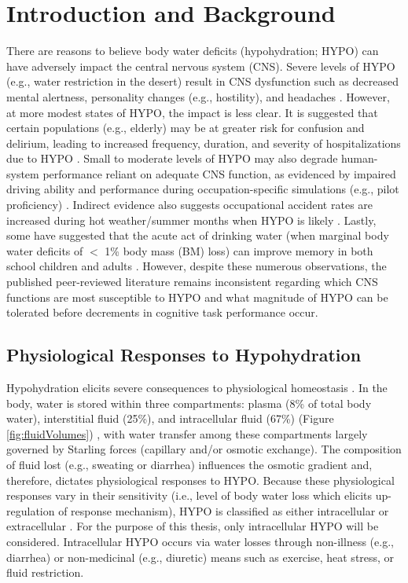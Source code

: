 \chapter{Introduction and Background}

There are reasons to believe body water deficits (hypohydration; HYPO) can have adversely impact the central nervous system (CNS). Severe levels of HYPO (e.g., water restriction in the desert) result in CNS dysfunction such as decreased mental alertness, personality changes (e.g., hostility), and headaches \cite{adolf_physiology_1947, king_brief_1878}. However, at more modest states of HYPO, the impact is less clear. It is suggested that certain populations (e.g., elderly) may be at greater risk for confusion and delirium, leading to increased frequency, duration, and severity of hospitalizations due to HYPO \cite{inouye_delirium_2006,warren_burden_1994}. Small to moderate levels of HYPO may also degrade human-system performance reliant on adequate CNS function, as evidenced by impaired driving ability \cite{watson_mild_2015} and performance during occupation-specific simulations (e.g., pilot proficiency) \cite{lindseth_effects_2013}. Indirect evidence also suggests occupational accident rates are increased during hot weather/summer months when HYPO is likely \cite{kenefick_hydration_2007, kenefick_dehydration_2012}. Lastly, some have suggested that the acute act of drinking water (when marginal body water deficits of ${<}$ 1\% body mass (BM) loss) can improve memory in both school children and adults \cite{benton_effect_2009,benton_small_2015,benton_minor_2016,fadda_effects_2012}. However, despite these numerous observations, the published peer-reviewed literature remains inconsistent regarding which CNS functions are most susceptible to HYPO and what magnitude of HYPO can be tolerated before decrements in cognitive task performance occur.

\section{Physiological Responses to Hypohydration}
Hypohydration elicits severe consequences to physiological homeostasis \cite{iom_dietary_2004}. In the body, water is stored within three compartments: plasma (8\% of total body water), interstitial fluid (25\%), and intracellular fluid (67\%) (Figure \ref{fig:fluidVolumes}) \cite{sawka_thermoregulatory_1985}, with water transfer among these compartments largely governed by Starling forces (capillary and/or osmotic exchange). The composition of fluid lost (e.g., sweating or diarrhea) influences the osmotic gradient and, therefore, dictates physiological responses to HYPO. Because these physiological responses vary in their sensitivity (i.e., level of body water loss which elicits up-regulation of response mechanism), HYPO is classified as either intracellular or extracellular \cite{cheuvront_dehydration:_2014}. For the purpose of this thesis, only intracellular HYPO will be considered. Intracellular HYPO occurs via water losses through non-illness (e.g., diarrhea) or non-medicinal (e.g., diuretic) means such as exercise, heat stress, or fluid restriction. 

